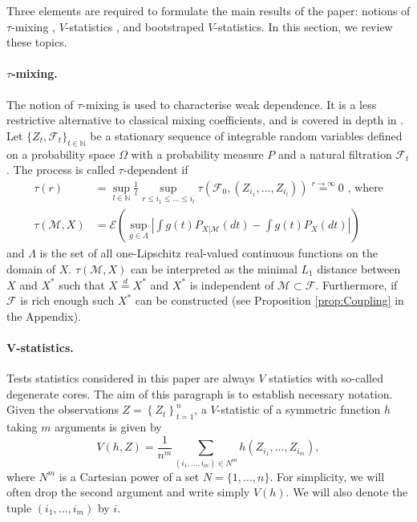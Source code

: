\documentclass{article} %
\newcommand{\ev}{\mathcal{E}}
\begin{document}
Three elements are required to formulate the main results of the paper: notions of $\tau$-mixing \cite{dedecker2007weak}, $V$-statistics \cite{serfling80}, and bootstraped $V$-statistics. In this section, we review these topics.

\paragraph{$\tau$-mixing.} The notion of $\tau$-mixing is used to characterise weak dependence. It is a less restrictive alternative to classical mixing coefficients, and is covered in depth in \cite{dedecker2007weak}. Let $\{Z_t,\mathcal{F}_t\}_{t \in \mathbb{N}}$  be a stationary sequence of integrable random variables defined on a probability space $\Omega$ with a probability measure $P$ and a natural filtration $\mathcal{F}_t$. The process  is called $\tau$-dependent if 
\begin{align*}
\tau(r) &= \sup_{l \in \mathbb{N}} \frac 1 l \sup_{ r \leq i_1 \leq ... \leq i_l} \tau( \mathcal F_0,(Z_{i_1},...,Z_{i_l}) )  \overset{r \to \infty}{=} 0 \text{ , where} \\
\tau(\mathcal{M},X) &=  \ev \left( \sup_{g \in \Lambda} \left| \int g(t) P_{X|\mathcal{M}}(dt) - \int g(t) P_X(dt) \right| \right)
\end{align*}
and $\Lambda$ is the set of all one-Lipschitz real-valued continuous functions on the domain of $X$. $\tau(\mathcal M,X)$ can be interpreted as the minimal $L_1$ distance between $X$ and $X^*$ such that $X \overset{d}{=}X^*$ and $X^*$ is independent of $\mathcal M \subset \mathcal F$. Furthermore, if $\mathcal F$ is rich enough such $X^*$ can be constructed (see Proposition \ref{prop:Coupling} in the Appendix).
  

\paragraph{V-statistics.} Tests statistics considered in this paper are always $V$ statistics with so-called degenerate cores. The aim of this paragraph is to  establish  necessary notation. Given the observations $Z=\left\{Z_t\right\}_{t=1}^n$, a $V$-statistic of a symmetric function $h$ taking $m$ arguments is given by 
\begin{equation}
\label{def:Vstat}
V(h,Z) = \frac{1}{n^m} \sum_{(i_1,...,i_m) \in N^m} h(Z_{i_1},...,Z_{i_m}),
\end{equation}
where $N^m$ is a Cartesian power of a set $N= \{1,...,n\}$. For simplicity, we will often drop the second argument and write simply $V(h)$. We will also denote the tuple $(i_1,...,i_m)$ by $i$. %
\end{document}
